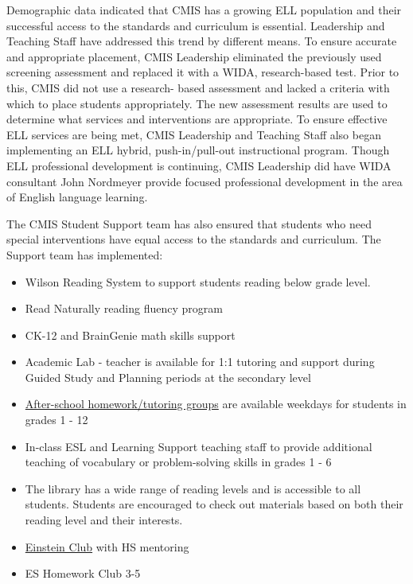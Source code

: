 \begin{findings}

Demographic data indicated that CMIS has a growing ELL  population and their successful access to the standards and curriculum is essential. Leadership and Teaching Staff have addressed this trend by different means. To ensure accurate and appropriate placement, CMIS Leadership eliminated the previously used screening assessment and replaced it with a WIDA, research-based test. Prior to this, CMIS did not use a research- based assessment and lacked a criteria with which to place students appropriately. The new assessment results are used to determine what services and interventions are appropriate. To ensure effective ELL  services are being met, CMIS Leadership and Teaching Staff also began implementing an ELL hybrid, push-in/pull-out instructional program. Though ELL professional development is continuing, CMIS Leadership did have WIDA consultant John Nordmeyer provide focused professional development in the area of English language learning. 


The CMIS Student Support team has also ensured that students who need special interventions have equal access to the standards and curriculum. The Support team has implemented:

\begin{itemize}
\item Wilson Reading System to support students reading below grade level.
\item Read Naturally reading fluency program
\item CK-12 and BrainGenie math skills support
\item Academic Lab - teacher is available for 1:1 tutoring and support during Guided Study and Planning periods at the secondary level
\item \href{https://docs.google.com/a/cmis.ac.th/spreadsheets/d/1JIQuOTYKcg2-y5Mi9wyM2RJpjW4RhCMfMmdPbrNycK8/edit?usp=sharing}{After-school homework/tutoring groups} are available weekdays for students in grades 1 - 12
\item In-class ESL and Learning Support teaching staff to provide additional teaching of vocabulary or problem-solving skills in grades 1 - 6
\item The library has a wide range of reading levels and is accessible to all students.  Students are encouraged to check out materials based on both their reading level and their interests.
\item \href{https://docs.google.com/a/cmis.ac.th/spreadsheets/d/15ipMxaVhlYTso-qKvMgiyaEIvFXVe_ikZ91zQGL9-zU/edit?usp=sharing}{Einstein Club} with HS mentoring 
\item ES Homework Club 3-5
\end{itemize}


\end{findings}
